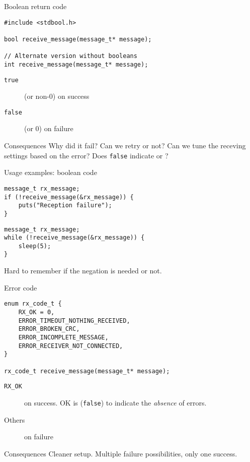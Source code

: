 \documentclass[aspectratio=169,14pt]{beamer}
\begin{document}
\begin{frame}[fragile]{Boolean return code}
\begin{lstlisting}[style=cstyle]
#include <stdbool.h>

bool receive_message(message_t* message);

// Alternate version without booleans
int receive_message(message_t* message);
\end{lstlisting}

    \begin{description}
        \item[\texttt{true}] (or non-0) on success
        \item[\texttt{false}] (or 0) on failure
    \end{description}
    
    \begin{block}{Consequences}
        Why did it fail? Can we retry or not? Can we tune the receving settings based on the error? Does \texttt{false} indicate  or ?
    \end{block}
\end{frame}


\begin{frame}[fragile]{Usage examples: boolean code}
\begin{lstlisting}[style=cstyle]
message_t rx_message;
if (!receive_message(&rx_message)) {
    puts("Reception failure");
}
\end{lstlisting}

\begin{lstlisting}[style=cstyle]
message_t rx_message;
while (!receive_message(&rx_message)) {
    sleep(5);
}
\end{lstlisting}

Hard to remember if the negation is needed or not.
\end{frame}


\begin{frame}[fragile]{Error code}
\begin{lstlisting}[style=cstyle]
enum rx_code_t {
    RX_OK = 0,
    ERROR_TIMEOUT_NOTHING_RECEIVED,
    ERROR_BROKEN_CRC,
    ERROR_INCOMPLETE_MESSAGE,
    ERROR_RECEIVER_NOT_CONNECTED,
}

rx_code_t receive_message(message_t* message);
\end{lstlisting}

\begin{description}
    \item[\texttt{RX\_OK}] on success. OK is (\texttt{false}) to indicate the \textit{absence} of errors.
    \item[Others] on failure
\end{description}

\begin{block}{Consequences}
    Cleaner setup. Multiple failure possibilities, only one success.
\end{block}
\end{frame}
\end{document}
